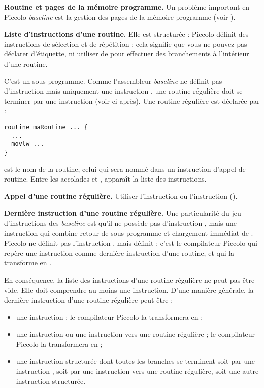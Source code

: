 \textbf{Routine et pages de la mémoire programme.} Un problème important en Piccolo \emph{baseline} est la gestion des pages de la mémoire programme (voir ).

\textbf{Liste d’instructions d’une routine.} Elle est structurée : Piccolo définit des instructions de sélection et de répétition : cela signifie que vous ne pouvez pas déclarer d’étiquette, ni utiliser de  pour effectuer des branchements à l’intérieur d’une routine.



C'est un sous-programme. Comme l'assembleur \emph{baseline} ne définit pas d'instruction  mais uniquement une instruction , une routine régulière doit se terminer par une instruction  (voir ci-après). Une routine régulière est déclarée par :
\begin{lstlisting}[language=piccolo]
routine maRoutine ... {
  ...
  movlw ...
}
\end{lstlisting}

 est le nom de la routine, celui qui sera nommé dans un instruction d’appel de routine. Entre les accolades \piccolo{\{} et \piccolo{\}}, apparaît la liste des instructions.

\textbf{Appel d’une routine régulière.} Utiliser l'instruction  ou l'instruction  ().

\textbf{Dernière instruction d’une routine régulière.} Une particularité du jeu d'instructions des \emph{baseline} est qu'il ne possède pas d'instruction , mais une instruction  qui combine retour de sous-programme et chargement immédiat de . Piccolo ne définit pas l'instruction , mais définit  : c'est le compilateur Piccolo qui repère une instruction  comme dernière instruction d'une routine, et qui la transforme en .

En conséquence, la liste des instructions d'une routine régulière ne peut pas être vide. Elle doit comprendre au moins une instruction. D'une manière générale, la dernière instruction d'une routine régulière peut être :
\begin{itemize}
  \item une instruction  ; le compilateur Piccolo la transformera en  ;
  \item une instruction  ou une instruction  vers une routine régulière ; le compilateur Piccolo la transformera en  ;
  \item une instruction  structurée dont toutes les branches se terminent soit par une instruction , soit par une instruction  vers une routine régulière, soit une autre instruction  structurée.
\end{itemize}

